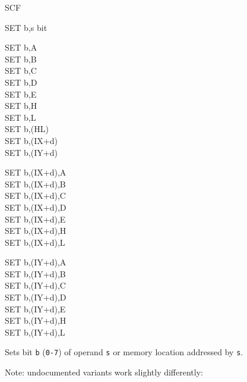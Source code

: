 \begin{basedescript}{
	\desclabelstyle{\multilinelabel}
	\desclabelwidth{3cm}}
\begin{DetailItem}{SCF}
		\begin{DetailEffects}
			\FlagsSCF
		\end{DetailEffects}
						
		\begin{DetailTiming}
		\end{DetailTiming}

	\end{DetailItem}

	\pagebreak
	\begin{DetailItem}{SET b,s}
		{ bit}
		{}

		\begin{DetailVariants}
			SET b,A\\
			SET b,B\\
			SET b,C\\
			SET b,D\\
			SET b,E\\
			SET b,H\\
			SET b,L\\
			SET b,(HL)\\
			SET b,(IX+d)\\
			SET b,(IY+d)

			\columnbreak
			SET b,(IX+d),A\UNDOC\\
			SET b,(IX+d),B\UNDOC\\
			SET b,(IX+d),C\UNDOC\\
			SET b,(IX+d),D\UNDOC\\
			SET b,(IX+d),E\UNDOC\\
			SET b,(IX+d),H\UNDOC\\
			SET b,(IX+d),L\UNDOC

			\columnbreak
			SET b,(IY+d),A\UNDOC\\
			SET b,(IY+d),B\UNDOC\\
			SET b,(IY+d),C\UNDOC\\
			SET b,(IY+d),D\UNDOC\\
			SET b,(IY+d),E\UNDOC\\
			SET b,(IY+d),H\UNDOC\\
			SET b,(IY+d),L\UNDOC
		\end{DetailVariants}

		Sets bit {\tt b} ({\tt 0-7}) of operand {\tt s} or memory location addressed by {\tt s}.

		Note: undocumented variants work slightly differently:

		\begin{multicols}{2}


\end{multicols}
\end{DetailItem}
\end{basedescript}
